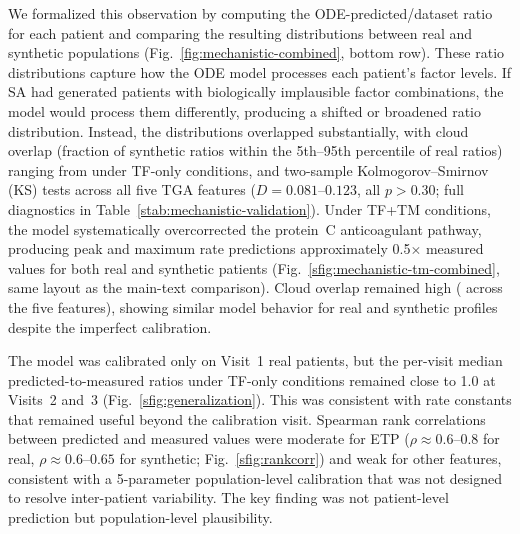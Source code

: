 We formalized this observation by computing the ODE-predicted/dataset ratio for each
patient and comparing the resulting distributions between real and synthetic
populations (Fig.~\ref{fig:mechanistic-combined}, bottom row). These ratio
distributions capture how the ODE model processes each patient's factor levels. If
SA had generated patients with biologically implausible factor combinations, the
model would process them differently, producing a shifted or broadened ratio
distribution. Instead, the distributions overlapped substantially, with cloud
overlap (fraction of synthetic ratios within the 5th--95th percentile of real
ratios) ranging from  under TF-only conditions,
and two-sample Kolmogorov--Smirnov (KS) tests  across all five TGA features
($D = 0.081$--$0.123$, all $p > 0.30$; full diagnostics in
Table~\ref{stab:mechanistic-validation}).
Under TF+TM conditions, the model systematically overcorrected the protein~C
anticoagulant pathway, producing peak and maximum rate predictions
approximately 0.5$\times$ measured values for both real and synthetic patients
(Fig.~\ref{sfig:mechanistic-tm-combined}, same layout as the main-text
comparison). Cloud overlap remained high ( across the
five features), showing similar model behavior for real and synthetic profiles despite the
imperfect calibration.

The model was calibrated only on Visit~1 real patients, but the per-visit median predicted-to-measured
ratios under TF-only conditions remained close to 1.0 at Visits~2 and~3
(Fig.~\ref{sfig:generalization}). This was consistent with rate constants that remained useful
beyond the calibration visit. Spearman rank correlations between predicted and measured values were
moderate for ETP ($\rho \approx 0.6$--$0.8$ for real, $\rho \approx 0.6$--$0.65$
for synthetic; Fig.~\ref{sfig:rankcorr}) and weak for other features, consistent with
a 5-parameter population-level calibration that was not designed to resolve
inter-patient variability. The key finding was not patient-level prediction but
population-level plausibility. 

